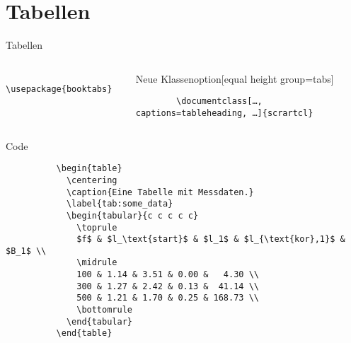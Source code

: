 \section{Tabellen}

\begin{frame}[fragile]{
  Tabellen
  \hfill
}
  \begin{columns}[t, onlytextwidth]
    \begin{column}{0.30\textwidth}
      \begin{Packages}[equal height group=tabs]
        \begin{verbatim}
          \usepackage{booktabs}
        \end{verbatim}
      \end{Packages}
    \end{column}
    \begin{column}{0.68\textwidth}
    \begin{block}{Neue Klassenoption}[equal height group=tabs]
      \begin{verbatim}
        \documentclass[…, captions=tableheading, …]{scrartcl}
      \end{verbatim}
    \end{block}
    \end{column}
  \end{columns}
  \vspace{-2pt}
  \begin{columns}[onlytextwidth, t]
    \begin{column}{0.60\textwidth}
      \fontsize{8}{6}
      \begin{block}{Code}
        \begin{verbatim}
          \begin{table}
            \centering
            \caption{Eine Tabelle mit Messdaten.}
            \label{tab:some_data}
            \begin{tabular}{c c c c c}
              \toprule
              $f$ & $l_\text{start}$ & $l_1$ & $l_{\text{kor},1}$ & $B_1$ \\
              \midrule
              100 & 1.14 & 3.51 & 0.00 &   4.30 \\
              300 & 1.27 & 2.42 & 0.13 &  41.14 \\
              500 & 1.21 & 1.70 & 0.25 & 168.73 \\
              \bottomrule
            \end{tabular}
          \end{table}

\end{verbatim}
\end{block}
\end{column}
\end{columns}
\end{frame}
